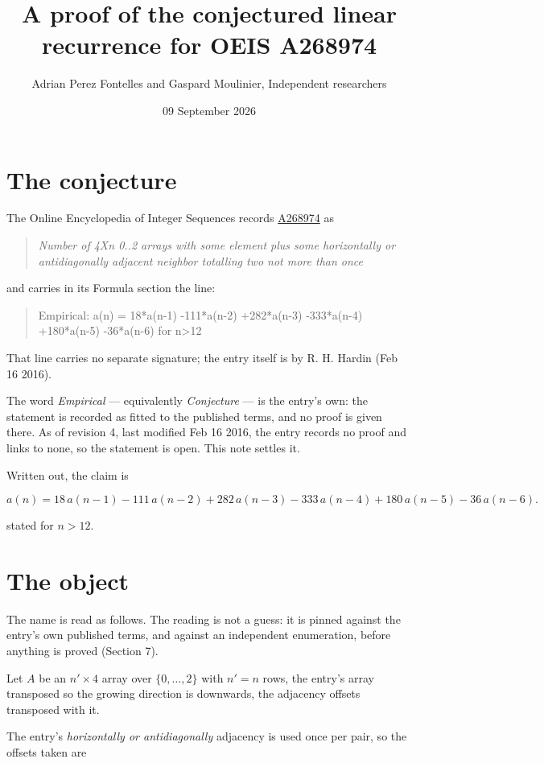 \documentclass[11pt]{article}
\title{A proof of the conjectured linear recurrence for OEIS A268974}
\author{Adrian Perez Fontelles and Gaspard Moulinier, Independent researchers}
\date{09 September 2026}
\theoremstyle{definition}
\begin{document}
\maketitle
\section{The conjecture}

The Online Encyclopedia of Integer Sequences records \href{https://oeis.org/A268974}{A268974} as

\begin{quote}\itshape Number of 4Xn 0..2 arrays with some element plus some horizontally or antidiagonally adjacent neighbor totalling two not more than once\end{quote}

and carries in its Formula section the line:

\begin{quote}\ttfamily Empirical: a(n) = 18*a(n-1) -111*a(n-2) +282*a(n-3) -333*a(n-4) +180*a(n-5) -36*a(n-6) for n>12\end{quote}

That line carries no separate signature; the entry itself is by R. H. Hardin (Feb 16 2016).

The word {\itshape Empirical} --- equivalently {\itshape Conjecture} --- is the entry's own: the statement is recorded as fitted to the published terms, and no proof is given there. As of revision 4, last modified Feb 16 2016, the entry records no proof and links to none, so the statement is open. This note settles it.

Written out, the claim is

\[a(n) = 18\,a(n-1) - 111\,a(n-2) + 282\,a(n-3) - 333\,a(n-4) + 180\,a(n-5) - 36\,a(n-6).\]

stated for $n > 12$.

\section{The object}

The name is read as follows. The reading is not a guess: it is pinned against the entry's own published terms, and against an independent enumeration, before anything is proved (Section 7).

Let $A$ be an $n' \times 4$ array over $\{0,\dots,2\}$ with $n' = n$ rows, the entry's array transposed so the growing direction is downwards, the adjacency offsets transposed with it.

The entry's {\itshape horizontally or antidiagonally} adjacency is used once per pair, so the offsets taken are
\end{document}
